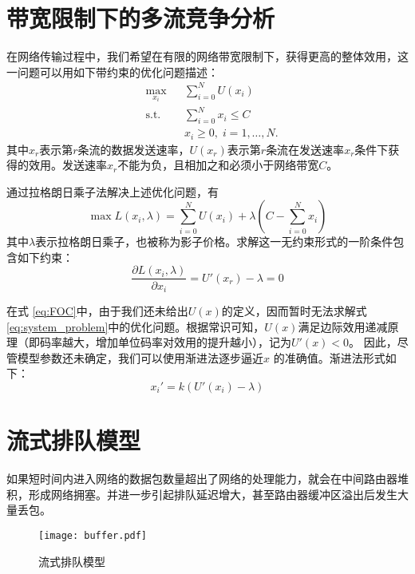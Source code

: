 \section{带宽限制下的多流竞争分析}
\label{section:shadow_price}

在网络传输过程中，我们希望在有限的网络带宽限制下，获得更高的整体效用，这一问题可以用如下带约束的优化问题描述：
\begin{equation}
\label{eq:system_problem}
\begin{aligned}
& \max_{x_i}
& & \sum_{i=0}^N{U(x_i)} \\
& \text{s.t.}
& & \sum_{i=0}^N{x_i} \leq C \\
&&& x_i \geq 0, \; i = 1, \ldots, N.
\end{aligned}
\end{equation}
其中$x_r$表示第$r$条流的数据发送速率，$U(x_r)$表示第$r$条流在发送速率$x_r$条件下获得的效用。发送速率$x_r$不能为负，且相加之和必须小于网络带宽$C$。

通过拉格朗日乘子法解决上述优化问题，有
\begin{equation}
\label{eq:lagrangian}
  \max L(x_i, \lambda) = \sum_{i=0}^N{U(x_i)} + \lambda (C-\sum_{i=0}^N{x_i})
\end{equation}
其中$\lambda$表示拉格朗日乘子，也被称为影子价格。求解这一无约束形式的一阶条件包含如下约束：
\begin{equation}
\label{eq:FOC}
  \frac{\partial L(x_i, \lambda)}{\partial x_i} = U'(x_r) - \lambda = 0
\end{equation}

在式 \ref{eq:FOC}中，由于我们还未给出$U(x)$的定义，因而暂时无法求解式 \ref{eq:system_problem}中的优化问题。根据常识可知，$U(x)$满足边际效用递减原理（即码率越大，增加单位码率对效用的提升越小），记为$U'(x) < 0$。 因此，尽管模型参数还未确定，我们可以使用渐进法逐步逼近$x$ 的准确值。渐进法形式如下：
\begin{equation}
\label{eq:approach}
  x_i' = k ( U'(x_i) - \lambda)
\end{equation}


\section{流式排队模型}
如果短时间内进入网络的数据包数量超出了网络的处理能力，就会在中间路由器堆积，形成网络拥塞。并进一步引起排队延迟增大，甚至路由器缓冲区溢出后发生大量丢包。

\begin{figure}[htbp]
  \centering
  \texttt{[image: buffer.pdf]}
  \caption{流式排队模型}
  \label{fig:buffer}
\end{figure}

